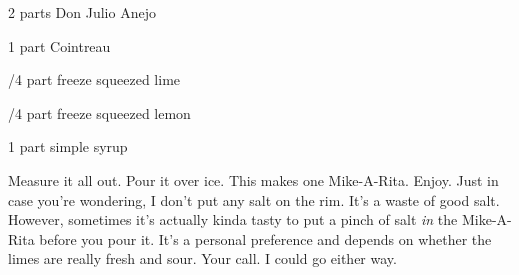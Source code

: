 %
%
%
%
\newpage



\begin{IngredientsAndSteps}
      \ListIngredientsAndSteps
      {
            2 parts Don Julio Anejo

            1 part Cointreau

            /4 part freeze squeezed lime

            /4 part freeze squeezed lemon

            1 part simple syrup
      }
      {
            Measure it all out. Pour it over ice. This makes one Mike-A-Rita. Enjoy. Just in case you're
            wondering, I don't put any salt on the rim. It's a waste of good salt. However, sometimes
            it's actually kinda tasty to put a pinch of salt \textit{in} the Mike-A-Rita before you
            pour it. It's a personal preference and depends on whether the limes are really fresh
            and sour. Your call. I could go either way.
      }
\end{IngredientsAndSteps}
